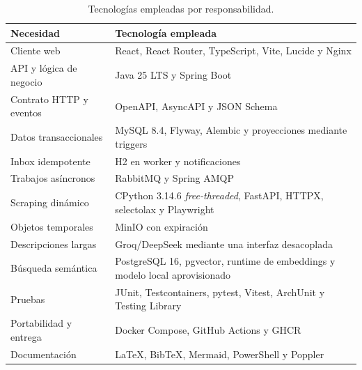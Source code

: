 \begin{table}[H]
	\centering
	\small
	\begin{tabularx}{\textwidth}{p{}X}
		\toprule
		\textbf{Necesidad}      & \textbf{Tecnología empleada}                                                 \\
		\midrule
		Cliente web             & React, React Router, TypeScript, Vite, Lucide y Nginx                        \\
		API y lógica de negocio & Java 25 LTS y Spring Boot                                       \\
		Contrato HTTP y eventos & OpenAPI, AsyncAPI y JSON Schema                                              \\
		Datos transaccionales   & MySQL 8.4, Flyway, Alembic y proyecciones mediante triggers                  \\
		Inbox idempotente       & H2 en worker y notificaciones                                                \\
		Trabajos asíncronos     & RabbitMQ y Spring AMQP                                                       \\
		Scraping dinámico       & CPython 3.14.6 \emph{free-threaded}, FastAPI, HTTPX, selectolax y Playwright \\
		Objetos temporales      & MinIO con expiración                                                         \\
		Descripciones largas    & Groq/DeepSeek mediante una interfaz desacoplada                              \\
		Búsqueda semántica      & PostgreSQL 16, pgvector, runtime de embeddings y modelo local aprovisionado  \\
		Pruebas                 & JUnit, Testcontainers, pytest, Vitest, ArchUnit y Testing Library                      \\
		Portabilidad y entrega  & Docker Compose, GitHub Actions y GHCR                                        \\
		Documentación           & \LaTeX{}, BibTeX, Mermaid, PowerShell y Poppler                              \\
		\bottomrule
	\end{tabularx}
	\caption{Tecnologías empleadas por responsabilidad.}
	\label{tabla:tecnologias-responsabilidad}
\end{table}
